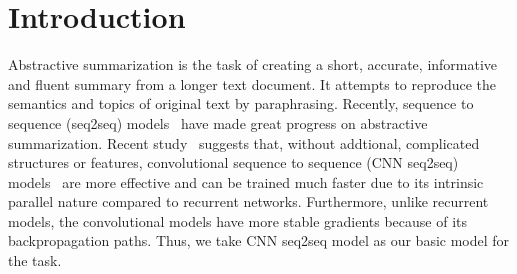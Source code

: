 \section{Introduction}
\label{sec:intro}

Abstractive summarization is the task of creating a short, accurate,
informative and fluent summary from a longer text document.
It attempts to reproduce the semantics and topics of original text
by paraphrasing. 
Recently, sequence to sequence (seq2seq)
models~\cite{RushCW15,ChopraAR16,NallapatiZSGX16,SeeLM17,PaulusXS17}
have made great progress on abstractive summarization.
Recent study~\cite{bai2018empirical} suggests that, 
without addtional, complicated structures or features,
convolutional sequence to sequence 
(CNN seq2seq) models~\cite{gehring2017convs2s,FanGA18,LiuLZ18} 
are more effective and can be trained much faster due to 
its intrinsic parallel nature compared to recurrent networks.
Furthermore, unlike recurrent models, 
the convolutional models have more stable gradients 
because of its backpropagation paths. 
Thus, we take CNN seq2seq model as our basic model for the task.

